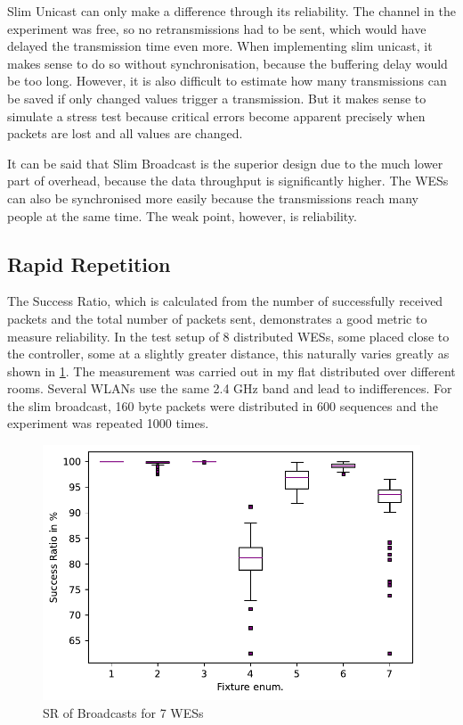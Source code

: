 Slim Unicast can only make a difference through its reliability.
The channel in the experiment was free, so no retransmissions had to be sent, which would have delayed the transmission time even more.
When implementing slim unicast, it makes sense to do so without synchronisation, because the buffering delay would be too long.
However, it is also difficult to estimate how many transmissions can be saved if only changed values trigger a transmission.
But it makes sense to simulate a stress test because critical errors become apparent precisely
when packets are lost and all values are changed.

It can be said that Slim Broadcast is the superior design due to the much lower part of overhead, 
because the data throughput is significantly higher.
The WESs can also be synchronised more easily because the transmissions reach many people at the same time.
The weak point, however, is reliability.

\subsection*{Rapid Repetition}

The Success Ratio, which is calculated from the number of successfully received packets 
and the total number of packets sent, demonstrates a good metric to measure reliability.
In the test setup of 8 distributed WESs, some placed close to the controller, 
some at a slightly greater distance,
this naturally varies greatly as shown in \cref{fig:sr_broadcast}.
The measurement was carried out in my flat distributed over different rooms.
Several WLANs use the same 2.4 GHz band and lead to indifferences.
For the slim broadcast, 160 byte packets were distributed in 600 sequences and 
the experiment was repeated 1000 times.

\begin{figure}[h]
	\centering
	\includegraphics[scale=0.6]{../Plot2/Graphs/SR_per_fixture_broadcast.pdf}
	\caption{SR of Broadcasts for 7 WESs}
	\label{fig:sr_broadcast}
\end{figure}

